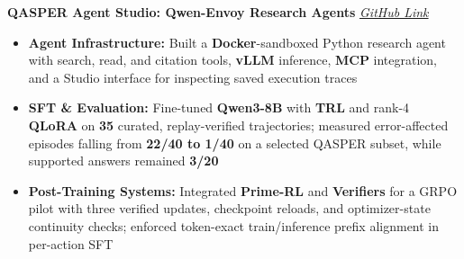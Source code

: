 \textbf{QASPER Agent Studio: Qwen-Envoy Research Agents}
\hfill
\textit{\textcolor[RGB]{80, 80, 80}{
\href{https://github.com/Jasonlingg/Qwen-Envoy}{GitHub Link}}}

\begin{itemize}
\item \textbf{Agent Infrastructure:} Built a \textbf{Docker}-sandboxed Python research agent with search, read, and citation tools, \textbf{vLLM} inference, \textbf{MCP} integration, and a Studio interface for inspecting saved execution traces

\item \textbf{SFT \& Evaluation:} Fine-tuned \textbf{Qwen3-8B} with \textbf{TRL} and rank-4 \textbf{QLoRA} on \textbf{35} curated, replay-verified trajectories; measured error-affected episodes falling from \textbf{22/40 to 1/40} on a selected QASPER subset, while supported answers remained \textbf{3/20}

\item \textbf{Post-Training Systems:} Integrated \textbf{Prime-RL} and \textbf{Verifiers} for a GRPO pilot with three verified updates, checkpoint reloads, and optimizer-state continuity checks; enforced token-exact train/inference prefix alignment in per-action SFT
\end{itemize}
